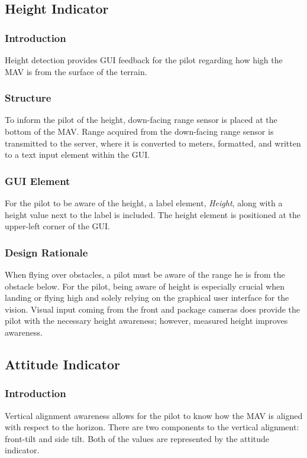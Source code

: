 \documentclass[onecolumn, oneside, letterpaper, draftclsnofoot, 10pt, compsoc]{IEEEtran}
\begin{document}
\subsection{Height Indicator}
\subsubsection{Introduction}
Height detection provides GUI feedback for the pilot regarding how high the MAV is from the surface of the terrain.

\subsubsection{Structure}
To inform the pilot of the height, down-facing range sensor is placed at the bottom of the MAV. Range acquired from the down-facing range sensor is transmitted to the server, where it is converted to meters, formatted, and written to a text input element within the GUI.

\subsubsection{GUI Element}
For the pilot to be aware of the height, a label element, \textit{Height}, along with a height value next to the label is included. The height element is positioned at the upper-left corner of the GUI.

\subsubsection{Design Rationale}
When flying over obstacles, a pilot must be aware of the range he is from the obstacle below. For the pilot, being aware of height is especially crucial when landing or flying high and solely relying on the graphical user interface for the vision. Visual input coming from the front and package cameras does provide the pilot with the necessary height awareness; however, measured height improves awareness.

\subsection{Attitude Indicator}
\subsubsection{Introduction}
Vertical alignment awareness allows for the pilot to know how the MAV is aligned with respect to the horizon. There are two components to the vertical alignment: front-tilt and side tilt. Both of the values are represented by the attitude indicator.
\end{document}
